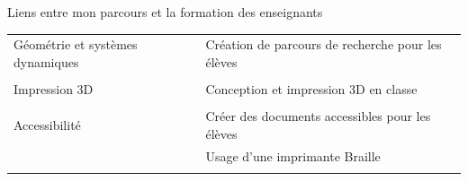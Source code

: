 \documentclass[
  french,
  ignorenonframetext,
]{beamer}
\begin{document}
\begin{frame}{Liens entre mon parcours et la formation des enseignants}
\protect\hypertarget{liens-entre-mon-parcours-et-la-formation-des-enseignants}{}
\begin{longtable}[]{@{}ll@{}}
\toprule
\endhead
\begin{minipage}[t]{0.24\columnwidth}\raggedright
Géométrie et systèmes dynamiques\strut
\end{minipage} & \begin{minipage}[t]{0.70\columnwidth}\raggedright
Création de parcours de recherche pour les élèves\strut
\end{minipage}\tabularnewline
\begin{minipage}[t]{0.24\columnwidth}\raggedright
\strut
\end{minipage} & \begin{minipage}[t]{0.70\columnwidth}\raggedright
\strut
\end{minipage}\tabularnewline
\begin{minipage}[t]{0.24\columnwidth}\raggedright
Impression 3D\strut
\end{minipage} & \begin{minipage}[t]{0.70\columnwidth}\raggedright
Conception et impression 3D en classe\strut
\end{minipage}\tabularnewline
\begin{minipage}[t]{0.24\columnwidth}\raggedright
\strut
\end{minipage} & \begin{minipage}[t]{0.70\columnwidth}\raggedright
\strut
\end{minipage}\tabularnewline
\begin{minipage}[t]{0.24\columnwidth}\raggedright
Accessibilité\strut
\end{minipage} & \begin{minipage}[t]{0.70\columnwidth}\raggedright
Créer des documents accessibles pour les élèves\strut
\end{minipage}\tabularnewline
\begin{minipage}[t]{0.24\columnwidth}\raggedright
\strut
\end{minipage} & \begin{minipage}[t]{0.70\columnwidth}\raggedright
Usage d'une imprimante Braille\strut
\end{minipage}\tabularnewline
\begin{minipage}[t]{0.24\columnwidth}\raggedright
\strut
\end{minipage} & \begin{minipage}[t]{0.70\columnwidth}\raggedright

\end{minipage}
\end{longtable}
\end{frame}
\end{document}
